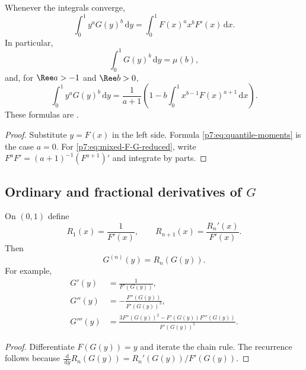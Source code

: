 \documentclass[11pt,oneside]{article}
\theoremstyle{definition}
\theoremstyle{remark}
\newcommand{\dd}{\,\mathrm d}
\newcommand{\1}{\mathbf 1}
\begin{document}
\begin{proposition}
\label{p7:prop:mixed-F-G}
Whenever the integrals converge,
\begin{equation}
 \int_0^1y^aG(y)^b\dd y
 =\int_0^1F(x)^a x^bF'(x)\dd x.
 \label{p7:eq:mixed-F-G}
\end{equation}
In particular,
\begin{equation}
 \int_0^1G(y)^b\dd y=\mu(b),
 \label{p7:eq:quantile-moments}
\end{equation}
and, for $\Ree a>-1$ and $\Ree b>0$,
\begin{equation}
 \int_0^1y^aG(y)^b\dd y
 =\frac1{a+1}\left(1-b\int_0^1x^{b-1}F(x)^{a+1}\dd x\right).
 \label{p7:eq:mixed-F-G-reduced}
\end{equation}
These formulas are \statusproved.
\end{proposition}

\begin{proof}
Substitute $y=F(x)$ in the left side.  Formula \cref{p7:eq:quantile-moments} is the case
$a=0$.  For \cref{p7:eq:mixed-F-G-reduced}, write
$F^aF'=(a+1)^{-1}(F^{a+1})'$ and integrate by parts.
\end{proof}

\subsection{Ordinary and fractional derivatives of $G$}

\begin{proposition}
\label{p7:prop:inverse-derivatives}
On $(0,1)$ define
\begin{equation}
 R_1(x)=\frac1{F'(x)},
 \qquad
 R_{n+1}(x)=\frac{R_n'(x)}{F'(x)}.
 \label{p7:eq:Rn-recurrence}
\end{equation}
Then
\begin{equation}
 G^{(n)}(y)=R_n(G(y)).
 \label{p7:eq:inverse-n-derivative}
\end{equation}
For example,
\begin{align}
 G'(y)&=\frac1{F'(G(y))},\label{p7:eq:Gprime}\\
 G''(y)&=-\frac{F''(G(y))}{F'(G(y))^3},\label{p7:eq:Gsecond}\\
 G'''(y)&=
 \frac{3F''(G(y))^2-F'(G(y))F'''(G(y))}{F'(G(y))^5}.
 \label{p7:eq:Gthird}
\end{align}
\end{proposition}

\begin{proof}
Differentiate $F(G(y))=y$ and iterate the chain rule.  The recurrence follows because
$\frac{\dd}{\dd y}R_n(G(y))=R_n'(G(y))/F'(G(y))$.
\end{proof}
\end{document}
